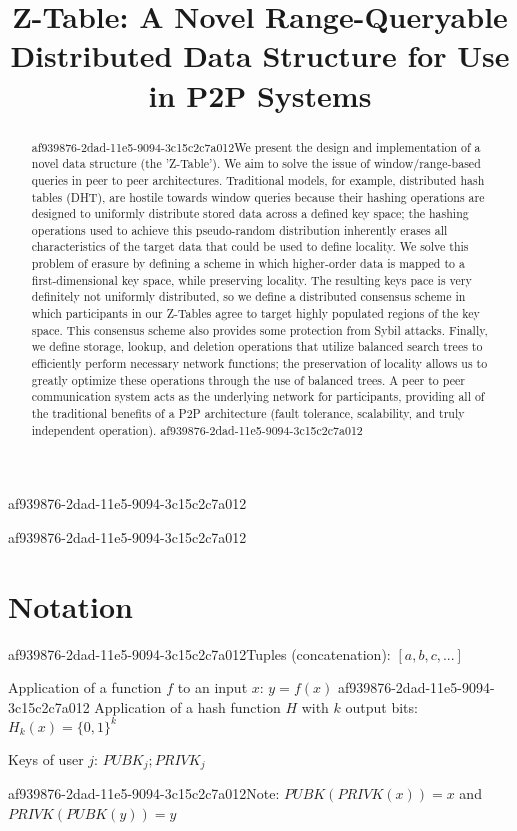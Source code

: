 \documentclass[12pt]{article}
\title{Z-Table: A Novel Range-Queryable Distributed Data Structure for Use in P2P Systems}
\begin{document}
af939876-2dad-11e5-9094-3c15c2c7a012\maketitle

\begin{abstract}
af939876-2dad-11e5-9094-3c15c2c7a012We present the design and implementation of a novel data structure (the 'Z-Table'). We aim to solve the issue of window/range-based queries in peer to peer architectures. Traditional models, for example,  distributed hash tables (DHT), are hostile towards window queries because their hashing operations are designed to uniformly distribute stored data across a defined key space; the hashing operations used to achieve this pseudo-random distribution inherently erases all characteristics of the target data that could be used to define locality. We solve this problem of erasure by defining a scheme in which higher-order data is mapped to a first-dimensional key space, while preserving locality. The resulting keys pace is very definitely not uniformly distributed, so we define a distributed consensus scheme in which participants in our Z-Tables agree to target highly populated regions of the key space. This consensus scheme also provides some protection from Sybil attacks. Finally, we define storage, lookup, and deletion operations that utilize balanced search trees to efficiently perform necessary network functions; the preservation of locality allows us to greatly optimize these operations through the use of balanced trees. A peer to peer communication system acts as the underlying network for participants, providing all of the traditional benefits of a P2P architecture (fault tolerance, scalability, and truly independent operation).
af939876-2dad-11e5-9094-3c15c2c7a012\end{abstract}

af939876-2dad-11e5-9094-3c15c2c7a012\section{Notation}

af939876-2dad-11e5-9094-3c15c2c7a012Tuples (concatenation): $[a,b,c,...]$

Application of a function $f$ to an input $x$: $y=f(x)$
af939876-2dad-11e5-9094-3c15c2c7a012
Application of a hash function $H$ with $k$ output bits: $H_{k}(x) = \{0,1\}^k$

Keys of user $j$: $ PUBK_j; PRIVK_j $

af939876-2dad-11e5-9094-3c15c2c7a012Note: $PUBK(PRIVK(x)) = x$ and $PRIVK(PUBK(y)) = y$~
\end{document}
